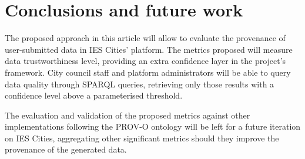 \section{Conclusions and future work}
\label{sec:conclusions}

The proposed approach in this article will allow to evaluate the provenance of user-submitted data in IES Cities' platform. The metrics proposed will measure data trustworthiness level, providing an extra confidence layer in the project's framework. City council staff and platform administrators will be able to query data quality through SPARQL queries, retrieving only those results with a confidence level above a parameterised threshold.

The evaluation and validation of the proposed metrics against other implementations following the PROV-O ontology will be left for a future iteration on IES Cities, aggregating other significant metrics should they improve the provenance of the generated data.
